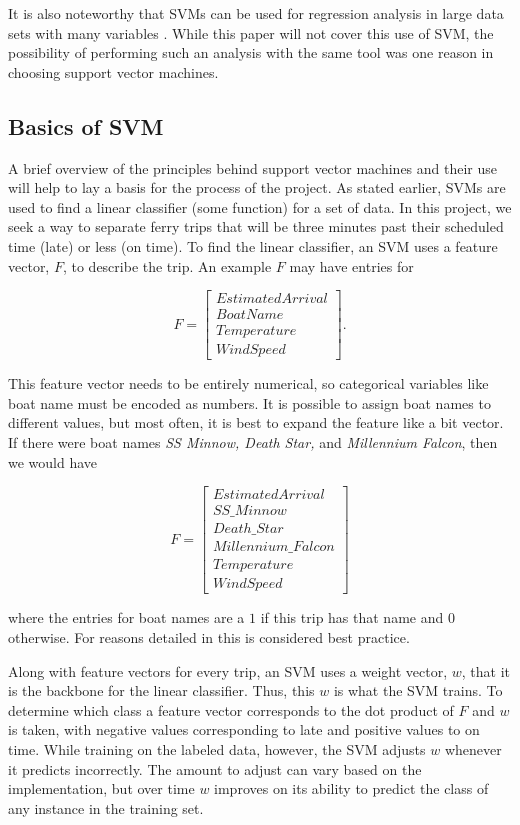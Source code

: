 \documentclass[11pt]{article} %
\begin{document}
It is also noteworthy that SVMs can be used for regression analysis in large
data sets with many variables \cite{chang2011libsvm}. While this paper will not
cover this use of SVM, the possibility of performing such an analysis with the
same tool was one reason in choosing support vector machines.


\subsection{Basics of SVM}
\label{sec:basics_svm}
A brief overview of the principles behind support vector machines and their use
will help to lay a basis for the process of the project. As stated earlier,
SVMs are used to find a linear classifier (some function) for a set of data.  In
this project, we seek a way to separate ferry trips that will be three minutes
past their scheduled time (late) or less (on time). To find the linear classifier,
an SVM uses a feature vector, $F$, to describe the trip.  An example $F$ may have
entries for

\[F=\begin{bmatrix}
        EstimatedArrival \\
        BoatName\\
        Temperature\\
        WindSpeed
\end{bmatrix}.\]

This feature vector needs to be entirely numerical, so categorical variables like
boat name must be encoded as numbers.  It is possible to assign boat names to
different values, but most often, it is best to expand the feature like a bit
vector.  If there were boat names \textit{SS Minnow, Death Star,} and 
\textit{Millennium Falcon}, then we would have

\[F=\begin{bmatrix}
        EstimatedArrival \\
        SS\_Minnow\\
        Death\_Star\\
        Millennium\_Falcon\\
        Temperature\\
        WindSpeed
\end{bmatrix}\]

where the entries for boat names are a $1$ if this trip has that name and $0$
otherwise. For reasons detailed in \cite{chang2011libsvm} this is considered 
best practice.

Along with feature vectors for every trip, an SVM uses a weight vector, $w$,
that it is the backbone for the linear classifier. Thus, this $w$ is what the
SVM trains. To determine which class a feature vector corresponds to the
dot product of $F$ and $w$ is taken, with negative values corresponding to 
late and positive values to on time. While training on the labeled data, however,
the SVM adjusts $w$ whenever it predicts incorrectly.  The amount to adjust
can vary based on the implementation, but over time $w$ improves on its ability
to predict the class of any instance in the training set.
\end{document}
